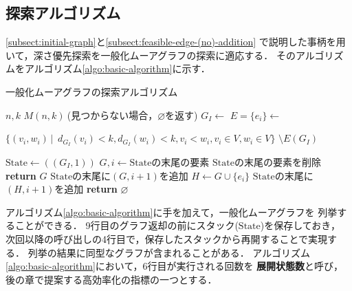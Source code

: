 \subsection{探索アルゴリズム}
\ref{subsect:initial-graph}と\ref{subsect:feasible-edge-(no)-addition}
で説明した事柄を用いて，深さ優先探索を一般化ムーアグラフの探索に適応する．
そのアルゴリズムをアルゴリズム\ref{algo:basic-algorithm}に示す．
\begin{algorithm}[H]
  \caption{一般化ムーアグラフの探索アルゴリズム}
  \label{algo:basic-algorithm}
  \begin{algorithmic}[1]
    \Require $n,k$
    \Ensure $M(n,k)\:$(見つからない場合，$\varnothing$を返す)
    \State $G_I\gets$
    \State $E=\{e_i\}\gets $\parbox[t]{\linewidth}{
      $\{(v_i,w_i)\,|$
      $\,d_{G_I}(v_i)<k,d_{G_I}(w_i)<k,v_i<w_i,v_i\in V,w_i\in V\}$
      $\setminus E(G_I)$
    }
    \State $\mathrm{State}\gets((G_I,1))$
    \State $G,i\gets\mathrm{State}$の末尾の要素
    \State $\mathrm{State}$の末尾の要素を削除
    \State \textbf{return} $G$
    \EndIf
    \State $\mathrm{State}$の末尾に$(G,i+1)$を追加
    \EndIf
    \State $H\gets G\cup\{e_i\}$
    \State $\mathrm{State}$の末尾に$(H,i+1)$を追加
    \EndIf
    \EndWhile
    \State \textbf{return} $\varnothing$
    \EndProcedure
  \end{algorithmic}
\end{algorithm}
アルゴリズム\ref{algo:basic-algorithm}に手を加えて，一般化ムーアグラフを
列挙することができる．
9行目のグラフ返却の前にスタック($\mathrm{State}$)を保存しておき，
次回以降の呼び出しの4行目で，保存したスタックから再開することで実現する．
列挙の結果に同型なグラフが含まれることがある．
アルゴリズム\ref{algo:basic-algorithm}において，6行目が実行される回数を
\textbf{展開状態数}と呼び，後の章で提案する高効率化の指標の一つとする．

